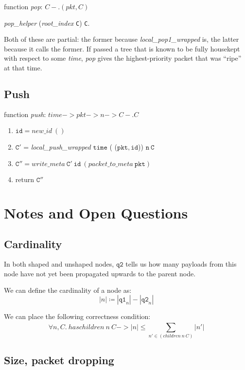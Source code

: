 \documentclass{article}
\begin{document}
\noindent function \textit{pop}: $C -. (\mathit{pkt}, C)$

\textit{pop\_helper} (\textit{root\_index} \texttt{C}) \texttt{C}.

\vspace{1em}
\noindent Both of these are partial: the former because \textit{local\_pop1\_wrapped} is,
the latter because it calls the former. 
If passed a tree that is known to be fully housekept with respect to some \textit{time}, 
\textit{pop} gives the highest-priority packet that was ``ripe'' at that time. 

\subsection{Push}

function \textit{push}: $\mathit{time} -> \mathit{pkt} -> n -> C -. C$ 
\begin{enumerate}
\item $\mathtt{id} = \mathit{new\_id~()}$
\item $\mathtt{C'}$ = \textit{local\_push\_wrapped} $\mathtt{time}$ ( ($\mathtt{pkt, id}$)) $\mathtt{n~C}$
\item $\mathtt{C''} = \mathit{write\_meta}~\mathtt{C' ~ id}~(\mathit{packet\_to\_meta}~\mathtt{pkt})$
\item return $\mathtt{C''}$
\end{enumerate}


\section{Notes and Open Questions}

\subsection{Cardinality}

In both shaped and unshaped nodes, $\mathtt{q2}$ tells us
how many payloads from this node have not yet been propagated upwards to 
the parent node.

We can define the cardinality of a node as:
$$|n| \coloneqq |\mathtt{q1}_n| - |\mathtt{q2}_n|$$

We can place the following correctness condition:  
$$\forall n, C.~\mathit{haschildren~n~C} -> |n| \le \sum_{n' \in (\mathit{children~n~C})}^{} |n'| $$

\subsection{Size, packet dropping}
\end{document}
